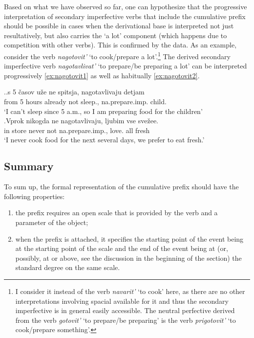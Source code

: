 Based on what we have observed so far, one can hypothesize that the progressive interpretation of secondary imperfective verbs that include the cumulative prefix  should be possible in cases when the derivational base is interpreted not just resultatively, but also carries the `a lot' component (which happens due to competition with other verbs). This is confirmed by the data. As an example, consider the verb \textit{nagotovit'} `to cook/prepare a lot'.\footnote{I consider it instead of the verb \textit{navarit'} `to cook' here, as there are no other interpretations involving spacial  available for it and thus the secondary imperfective is in general easily accessible. The neutral perfective derived from the verb \textit{gotovit'} `to prepare/be preparing' is the verb \textit{prigotovit'} `to cook/prepare something'.}  The derived secondary imperfective verb \textit{nagotavlivat'} `to prepare/be preparing a lot' can be interpreted progressively \ref{ex:nagotovit1} as well as habitually \ref{ex:nagotovit2}.

\ex.\label{ex:nagotovit}\ag.\label{ex:nagotovit1}s 5 \v{c}asov u\v{z}e ne spitsja, nagotavlivaju detjam\\
from 5 hours already not sleep., na.prepare.imp. child.\\
\trans `I can't sleep since 5 a.m., so I am preparing food for the children'\\
\bg.\label{ex:nagotovit2}Vprok nikogda ne nagotavlivaju, ljubim vse sve\v{z}ee.\\
{in store} never not na.prepare.imp., love. all fresh\\
\trans `I never cook food for the next several days, we prefer to eat fresh.'\\

\subsection{Summary} 
To sum up, the formal representation of the cumulative prefix  should have the following properties: 
\begin{enumerate}
\item the prefix requires an open scale that is provided by the verb and a parameter of the object;
\item when the prefix is attached, it specifies the starting point of the event being at the starting point of the scale and the end of the event being at (or, possibly, at or above, see the discussion in the beginning of the section) the standard degree on the same scale.
\end{enumerate}

